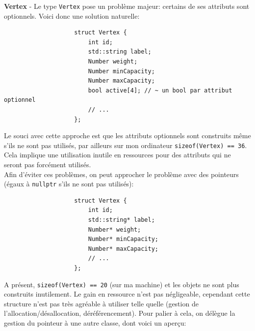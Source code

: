 \documentclass[french]{article}
\begin{document}
				\textbf{Vertex} - Le type \texttt{Vertex} pose un problème majeur: certains de ses attributs sont optionnels. Voici donc une solution naturelle:
				
				\begin{lstlisting}
					struct Vertex {
						int id;
						std::string label;
						Number weight;
						Number minCapacity;
						Number maxCapacity;
						bool active[4]; // ~ un bool par attribut optionnel
						// ...
					};
				\end{lstlisting}
				
				Le souci avec cette approche est que les attributs optionnels sont construits même s'ils ne sont pas utilisés, par ailleurs sur mon ordinateur \texttt{sizeof(Vertex) == 36}. Cela implique une utilisation inutile en ressources pour des attributs qui ne seront pas forcément utilisés.\\
				
				Afin d'éviter ces problèmes, on peut approcher le problème avec des pointeurs (égaux à \texttt{nullptr} s'ils ne sont pas utilisés):
				
				\begin{lstlisting}
					struct Vertex {
						int id;
						std::string* label;
						Number* weight;
						Number* minCapacity;
						Number* maxCapacity;
						// ...
					};
				\end{lstlisting}
				
				A présent, \texttt{sizeof(Vertex) == 20} (sur ma machine) et les objets ne sont plus construits inutilement. Le gain en ressource n'est pas négligeable, cependant cette structure n'est pas très agréable à utiliser telle quelle (gestion de l'allocation/désallocation, déréférencement). Pour palier à cela, on délègue la gestion du pointeur à une autre classe, dont voici un aperçu:
				
\end{document}
